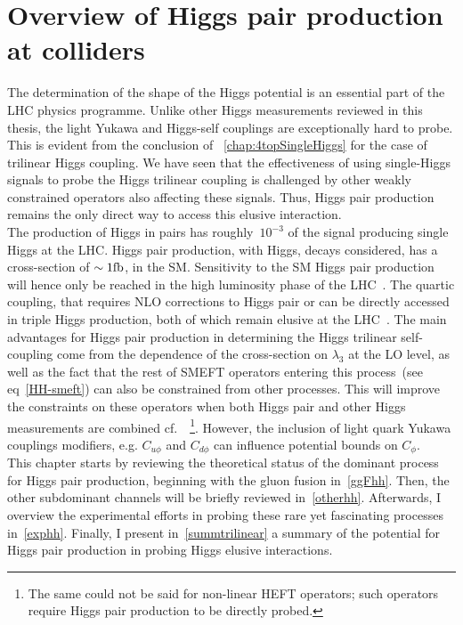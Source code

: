 
\chapter{ Overview of Higgs pair production at colliders }\label{chap:overviewDiHiggs}
The determination of the shape of the Higgs potential is an essential part of the LHC physics programme. Unlike other Higgs measurements reviewed in this thesis, the light Yukawa and Higgs-self couplings are exceptionally hard to probe.  This is evident from the conclusion of ~\autoref{chap:4topSingleHiggs} for the case of trilinear Higgs coupling. We have seen that the effectiveness of using single-Higgs signals to probe the Higgs trilinear coupling is challenged by other weakly constrained operators also affecting these signals. Thus, Higgs pair production remains the only direct way to access this elusive interaction. \\ The production of Higgs in pairs has roughly~$ 10^{-3} $ of the signal producing single Higgs at the LHC. Higgs pair production, with Higgs, decays considered, has a cross-section of $ \sim 1 \si{\femtobarn}$, in the SM. Sensitivity to the SM Higgs pair production will hence only be reached in the high luminosity phase of the LHC~\cite{Cepeda:2019klc}. The quartic coupling, that requires NLO corrections to Higgs pair or can be directly accessed in triple Higgs production, both of which remain elusive at the LHC~\cite{Plehn:2005nk}. The main advantages for Higgs pair production in determining the Higgs trilinear self-coupling come from the dependence of the cross-section on $\lambda_3$ at the LO level, as well as the fact that the rest of SMEFT operators entering this process~(see eq~\eqref{HH-smeft}) can also be constrained from other processes. This will improve the constraints on these operators when both Higgs pair and other Higgs measurements are combined cf.~\cite{DiVita:2017eyz}~\footnote{The same could not be said for non-linear HEFT operators; such operators require Higgs pair production to be directly probed.}. However, the inclusion of light quark Yukawa couplings modifiers, e.g. $ C_{u\phi}$ and $C_{d \phi}$ can influence potential bounds on $C_\phi$. \\
This chapter starts by reviewing the theoretical status of the dominant process for Higgs pair production, beginning with the gluon fusion in~\autoref{ggFhh}. Then, the other subdominant channels will be briefly reviewed in~\autoref{otherhh}.  Afterwards, I overview the experimental efforts in probing these rare yet fascinating processes in~\autoref{exphh}. Finally, I present  in~\autoref{summtrilinear} a summary of the potential for Higgs pair production in probing Higgs elusive interactions.
